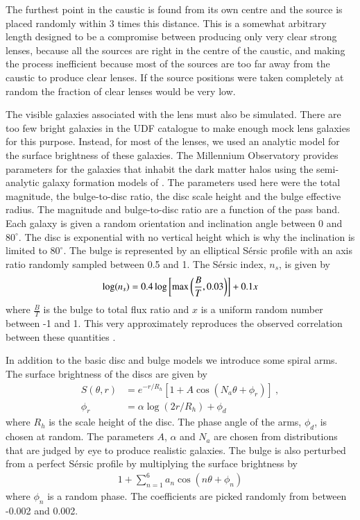 \documentclass{aa}
\newcommand{\degree}{^{\circ}}
\begin{document}
The furthest point in the caustic is found from its own centre and the source is placed randomly within 3 times this distance.  This is a somewhat arbitrary length designed to be a compromise between producing only very clear strong lenses, because all the sources are right in the centre of the caustic, and making the process inefficient because most of the sources are too far away from the caustic to produce clear lenses.  If the source positions were taken completely at random the fraction of clear lenses would be very low.

The visible galaxies associated with the lens must also be simulated. There  are too few bright galaxies in the UDF catalogue  to make enough mock lens galaxies for this purpose.  Instead, for most of the lenses, we used an analytic model for the surface brightness of these galaxies.  The Millennium Observatory provides parameters for the galaxies that inhabit the dark matter halos using the semi-analytic galaxy formation models of \citet{2011MNRAS.413..101G}.  The parameters used here were the total magnitude, the bulge-to-disc ratio, the disc scale height and the bulge effective radius.  The magnitude and bulge-to-disc ratio are a function of the pass band.  Each galaxy is given a random orientation and inclination angle between 0 and $80\degree$.  The disc is exponential with no vertical height which is why the inclination is limited to $80\degree$.  The bulge is represented by an elliptical S\'{e}rsic profile with an axis ratio randomly sampled between 0.5 and 1.  The S\'{e}rsic index, $n_s$, is given by 
\begin{align}
\log( n_s )= 0.4 \log\left[ {\rm max}\left(\frac{B}{T},0.03\right)\right] + 0.1 x 
\end{align}
where $\frac{B}{T}$ is the bulge to total flux ratio and $x$ is a uniform random number between -1 and 1.  This very approximately reproduces the observed correlation between these quantities \citep{2001AJ...121..820G}. 

In addition to the basic disc and bulge models we introduce some spiral arms.  The surface brightness of 
the discs are given by
\begin{align}
S(\theta,r) &= e^{-r/R_h} \left[ 1 + A \cos(N_a\theta + \phi_r ) \right]~, \\
\phi_r &= \alpha\log(2 r/ R_h) + \phi_d \nonumber
\end{align}
where $R_h$ is the scale height of the disc.  The phase angle of the arms, $\phi_d$, is chosen at random.  The parameters $A$, $\alpha$ and $N_a$ are chosen from distributions that are judged by eye to produce realistic 
galaxies.
The bulge is also perturbed from a perfect S\'{e}rsic profile by multiplying the surface brightness by
\begin{align}
1+\sum_{n=1}^6 a_n \cos\left( n \theta  + \phi_n \right)
\end{align}
where $\phi_n$ is a random phase.  The coefficients are picked randomly from between -0.002 and 0.002.   
\end{document}
